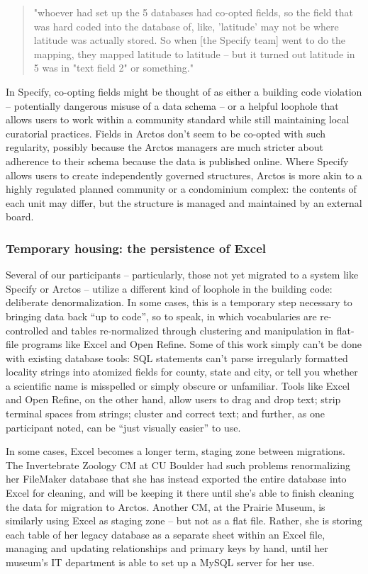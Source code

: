 \begin{quote}
"whoever had set up the 5 databases had co-opted fields, so the field that was hard coded into the database of, like, 'latitude' may not be where latitude was actually stored. So when [the Specify team] went to do the mapping, they mapped latitude to latitude -- but it turned out latitude in 5 was in "text field 2" or something." 
\end{quote}

In Specify, co-opting fields might be thought of as either a building code violation -- potentially dangerous misuse of a data schema -- or a helpful loophole that allows users to work within a community standard while still maintaining local curatorial practices. Fields in Arctos don't seem to be co-opted with such regularity, possibly because the Arctos managers are much stricter about adherence to their schema because the data is published online. Where Specify allows users to create independently governed structures, Arctos is more akin to a highly regulated planned community or a condominium complex: the contents of each unit may differ, but the structure is managed and maintained by an external board.

\subsubsection{Temporary housing: the persistence of Excel}

Several of our participants -- particularly, those not yet migrated to a system like Specify or Arctos -- utilize a different kind of loophole in the building code: deliberate denormalization. In some cases, this is a temporary step necessary to bringing data back “up to code”, so to speak, in which vocabularies are re-controlled and tables re-normalized through clustering and manipulation in flat-file programs like Excel and Open Refine. Some of this work simply can’t be done with existing database tools: SQL statements can’t parse irregularly formatted locality strings into atomized fields for county, state and city, or tell you whether a scientific name is misspelled or simply obscure or unfamiliar. Tools like Excel and Open Refine, on the other hand, allow users to drag and drop text; strip terminal spaces from strings; cluster and correct text; and further, as one participant noted, can be “just visually easier” to use.

In some cases, Excel becomes a longer term, staging zone between migrations. The Invertebrate Zoology CM at CU Boulder had such problems renormalizing her FileMaker database that she has instead exported the entire database into Excel for cleaning, and will be keeping it there until she’s able to finish cleaning the data for migration to Arctos. Another CM, at the Prairie Museum, is similarly using Excel as staging zone – but not as a flat file.  Rather, she is storing each table of her legacy database as a separate sheet within an Excel file, managing and updating relationships and primary keys by hand, until her museum’s IT department is able to set up a MySQL server for her use. 


